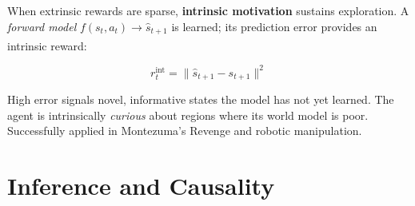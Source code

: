\begin{tcbitemize}[ skin=sectionraster ]
    \tcbitem[title=Curiosity-Driven Exploration, raster multicolumn=3]
    When extrinsic rewards are sparse, \textbf{intrinsic motivation} sustains
    exploration. A \emph{forward model} $f(s_t, a_t) \to \hat{s}_{t+1}$ is
    learned; its prediction error provides an intrinsic
    reward:\textsuperscript{\cite[][Ch.~2]{suttonReinforcementLearningIntroduction2018}}

    \begin{equation}
        r^{\mathrm{int}}_t = \bigl\lVert\hat{s}_{t+1} - s_{t+1}\bigr\rVert^2
    \end{equation}

    High error signals novel, informative states the model has not yet learned.
    The agent is intrinsically \emph{curious} about regions where its world
    model is poor. Successfully applied in Montezuma’s Revenge and robotic
    manipulation.

    \end{tcbitemize}


    \section{Inference and Causality}

